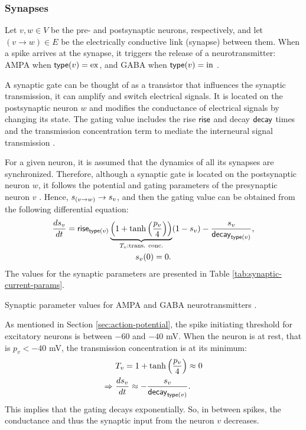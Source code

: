 \subsubsection{Synapses}

Let $v, w \in V$ be the pre- and postsynaptic neurons, respectively, and let $(v \to w) \in E$ be the electrically conductive link (synapse) between them. When a spike arrives at the synapse, it triggers the release of a neurotransmitter: AMPA when $\mathsf{type}(v) = \mathrm{ex}$, and GABA when $\mathsf{type}(v) = \mathrm{in}$ \cite{Lowet2015}.

A synaptic gate can be thought of as a transistor that influences the synaptic transmission, it can amplify and switch electrical signals. It is located on the postsynaptic neuron $w$ and modifies the conductance of electrical signals by changing its state. The gating value includes the rise $\mathsf{rise}$ and decay $\mathsf{decay}$ times and the transmission concentration term to mediate the interneural signal transmission \cite{Destexhe1994}.

For a given neuron, it is assumed that the dynamics of all its synapses are synchronized. Therefore, although a synaptic gate is located on the postsynaptic neuron $w$, it follows the potential and gating parameters of the presynaptic neuron $v$ \cite{Lowet2015}. Hence, $s_{(v \to w)} \to s_v$, and then the gating value can be obtained from the following differential equation:
\begin{gather}
    \frac{ds_v}{dt} = \mathsf{rise}_{\mathsf{type}(v)} \underbrace{\left( 1 + \tanh \left( \frac{p_{v}}{4} \right) \right)}_{T_v: \text{trans. conc.}} (1 - s_v) - \frac{s_v}{\mathsf{decay}_{\mathsf{type}(v)}}, \\
    \label{eq:synaptic-gates}
    s_v(0) = 0.
\end{gather}
The values for the synaptic parameters are presented in Table \ref{tab:synaptic-current-params}.

\begin{table}[!htp] 
    \centering
    
    \caption[Synaptic parameters]{Synaptic parameter values for AMPA and GABA neurotransmitters \cite{Lowet2015}.}
    \label{tab:synaptic-current-params}
\end{table}


As mentioned in Section \ref{sec:action-potential}, the spike initiating threshold for excitatory neurons is between $-60$ and $-40$ mV. When the neuron is at rest, that is $p_v < -40$ mV, the transmission concentration is at its minimum:
\begin{gather}
\begin{split}
    & T_v = 1 + \tanh \left( \frac{p_{v}}{4} \right) \approx 0 \\
    \Rightarrow \ & \frac{ds_v}{dt} \approx - \frac{s_v}{\mathsf{decay}_{\mathsf{type}(v)}}.
\end{split}
\end{gather}
This implies that the gating decays exponentially.
So, in between spikes, the conductance and thus the synaptic input from the neuron $v$ decreases. 

